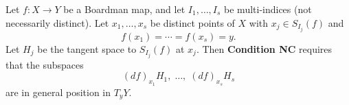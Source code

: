Let $f: X \to Y$ be a Boardman map, and let $I_1,\ldots,I_s$ be multi-indices (not necessarily distinct). Let $x_1,\ldots,x_s$ be distinct points of $X$ with $x_j \in S_{I_j}(f)$ and
$$f(x_1) = \cdots = f(x_s) = y.$$
Let $H_j$ be the tangent space to $S_{I_j}(f)$ at $x_j$. Then \textbf{Condition NC} requires that the subspaces
$$(df)_{x_1}H_1,\; \ldots,\; (df)_{x_s}H_s$$
are in general position in $T_y Y$.
